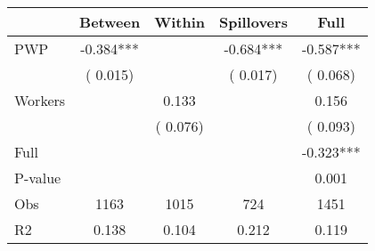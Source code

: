 
\begin{tabular}{l*{4}{c}}\hline&\multicolumn{1}{c}{Between}&\multicolumn{1}{c}{Within}&\multicolumn{1}{c}{Spillovers}&\multicolumn{1}{c}{Full}\\ \hline
 PWP           &             -0.384***      &                                               &       -0.684*** &        -0.587***                            \\ 
                               &        (       0.015)           &                                       &       (       0.017)     &      (       0.068)                                           \\ 
 Workers       &                                               &        0.133    &                                &             0.156                            \\ 
                               &                                               & (       0.076)                  &                                        &      (       0.093)                                           \\ 
\hline                                                                                                                                                                                                                                            
 Full                  &                                               &                                               &                                        &            -0.323***                                     \\ 
 P-value               &                                               &                                               &                                        &             0.001                                           \\ 
 Obs                   &               1163               &       1015                       &       724                &              1451                                               \\ 
 R2                    &                      0.138              &              0.104                      &              0.212               &                     0.119                                              \\ 
\hline \end{tabular}                                                                                                                                                                                                              